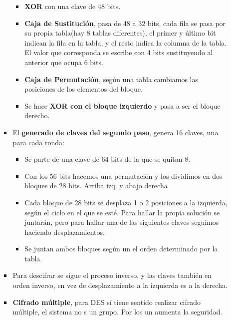 \documentclass[12pt, twoside, openright]{report} %
\begin{document}
\begin{itemize}
\begin{itemize}
\begin{itemize}
\begin{itemize}
        \item \textbf{XOR} con una clave de 48 bits.
          
        \item \textbf{Caja de Sustitución}, pasa de 48 a 32 bits, cada fila
          se pasa por su propia tabla(hay 8 tablas diferentes), el
          primer y último bit indican la fila en la tabla, y el resto
          indica la columna de la tabla. El valor que corresponda se
          escribe con 4 bits sustituyendo al anterior que ocupa 6 bits.
          
        \item \textbf{Caja de Permutación}, según una tabla cambiamos las
          posiciones de los elementos del bloque.
          
        \item Se hace \textbf{XOR con el bloque izquierdo} y pasa a ser el
          bloque derecho.
          
        \end{itemize}
      \item El \textbf{generado de claves del segundo paso}, genera 16
        claves, una para cada ronda:
        

        \begin{itemize}
        \item Se parte de una clave de 64 bits de la que se quitan 8.
          
        \item Con los 56 bits hacemos una permutación y los dividimos en dos
          bloques de 28 bits. Arriba izq. y abajo derecha
          
        \item Cada bloque de 28 bits se desplaza 1 o 2 posiciones a la
          izquierda, según el ciclo en el que se esté. Para hallar la
          propia solución se juntarán, pero para hallar una de las
          siguientes claves seguimos haciendo desplazamientos.
          
        \item Se juntan ambos bloques según un el orden determinado por la
          tabla.
          
        \end{itemize}
      \item Para descifrar se sigue el proceso inverso, y las claves también
        en orden inverso, en vez de desplazamiento a la izquierda es a
        la derecha.
        
      \item \textbf{Cifrado múltiple}, para DES sí tiene sentido realizar
        cifrado múltiple, el sistema no s un grupo. Por los un aumenta
        la seguridad.
        


\end{itemize}
\end{itemize}
\end{itemize}
\end{document}
